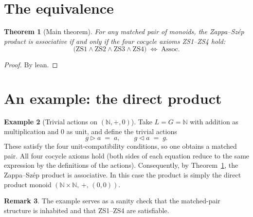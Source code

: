 \documentclass[11pt,a4paper]{article}
\theoremstyle{plain}
\newtheorem{theorem}{Theorem}[section]
\theoremstyle{definition}
\newtheorem{example}[theorem]{Example}
\newtheorem{remark}[theorem]{Remark}
\begin{document}
\section{The equivalence}

\begin{theorem}[Main theorem]\label{thm:zs-iff-assoc}
For any matched pair of monoids, the Zappa--Sz\'{e}p product is associative if
and only if the four cocycle axioms ZS1--ZS4 hold:
\begin{equation}
  \bigl(\mathrm{ZS1} \wedge \mathrm{ZS2}
        \wedge \mathrm{ZS3} \wedge \mathrm{ZS4}\bigr)
  \;\Longleftrightarrow\;
  \mathrm{Assoc}.
\end{equation}
\end{theorem}

\begin{proof}
By lean.
\end{proof}

\section{An example: the direct product}

\begin{example}[Trivial actions on $(\mathbb{N}, +, 0)$]\label{ex:nat-direct}
Take $L = G = \mathbb{N}$ with addition as multiplication and $0$ as unit, and
define the trivial actions
\begin{equation}
  g \triangleright a \;=\; a,
  \qquad
  g \triangleleft a \;=\; g.
\end{equation}
These satisfy the four unit-compatibility conditions, so one obtains a matched
pair. All four cocycle axioms hold (both sides of each equation reduce to the
same expression by the definitions of the actions). Consequently, by
Theorem~\ref{thm:zs-iff-assoc}, the Zappa--Sz\'{e}p product is associative. In
this case the product is simply the direct product monoid
$(\mathbb{N} \times \mathbb{N},\, +,\, (0,0))$.
\end{example}

\begin{remark}
The example serves as a sanity check that the matched-pair structure is
inhabited and that ZS1--ZS4 are satisfiable.
\end{remark}
\end{document}
